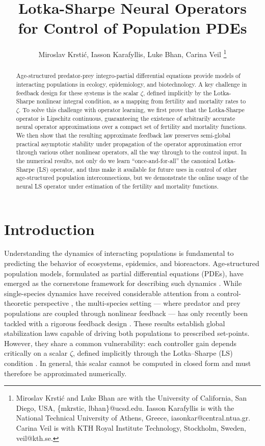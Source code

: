 \documentclass[journal,twoside,web]{ieeecolor}
\title{Lotka-Sharpe Neural Operators \\ for Control of Population  PDEs}
\author{Miroslav Krsti\'c, Iasson Karafyllis, Luke Bhan, Carina Veil
\thanks{Miroslav Krsti\'c and Luke Bhan are with the University of California, San Diego, USA, \{mkrstic, lbhan\}@ucsd.edu. Iasson Karafyllis is with the National Technical University of Athens, Greece, iasonkar@central.ntua.gr. Carina Veil is with KTH Royal Institute Technology, Stockholm, Sweden, veil@kth.se. 
}
}
\begin{document}
\maketitle
\begin{abstract}
Age-structured predator-prey integro-partial differential equations provide models of  interacting populations in ecology, epidemiology, and biotechnology. A key challenge in feedback design for these systems is the scalar $\zeta$, defined implicitly by the Lotka-Sharpe nonlinear integral condition, as a  mapping from fertility and mortality rates to $\zeta$. To solve this challenge with operator learning, we first prove that the Lotka-Sharpe operator is Lipschitz continuous, guaranteeing the existence of arbitrarily accurate neural operator approximations over a compact set of fertility and mortality functions. We then show that the resulting approximate feedback law preserves semi-global practical asymptotic stability under propagation of the operator approximation error through various other nonlinear operators, all the way through to the control input. In the numerical results, not only do we learn ``once-and-for-all'' the canonical Lotka-Sharpe (LS) operator, and thus make it available for future uses in control of other age-structured population interconnections, but we demonstrate the online usage of the neural LS operator under estimation of the fertility and mortality functions. 

\end{abstract}

\section{Introduction}


Understanding the dynamics of interacting populations is fundamental to predicting the behavior of ecosystems, epidemics, and bioreactors. Age-structured population models, formulated as partial differential equations (PDEs), have emerged as the cornerstone framework for describing such dynamics \cite{mckendrick1925Applications}. While single-species dynamics have received considerable attention from a control-theoretic perspective \cite{inaba2017age, iannelli2017basic, dochain2013automatic, schmidt2018yield, kurth2021tracking, kurth2023control, karafyllis2017stability, haacker2024stabilization, karafyllis2025agestructuredchemostatsubstratedynamics, BARGO2026104629}, the multi-species setting — where predator and prey populations are coupled through nonlinear feedback — has only recently been tackled with a rigorous feedback design \cite{veil2025stabilization, veil2025stabilizationagestructuredcompetingpopulations, veil2025stabilizationExtendedPreprint}. 
These results establish global stabilization laws capable of driving both populations to prescribed set-points. However, they share a common vulnerability: each controller gain depends critically on a scalar $\zeta$, defined implicitly through the Lotka--Sharpe (LS) condition \cite{sharpe1911problem}. In general, this scalar cannot be computed in closed form and must therefore be approximated numerically.
\end{document}
